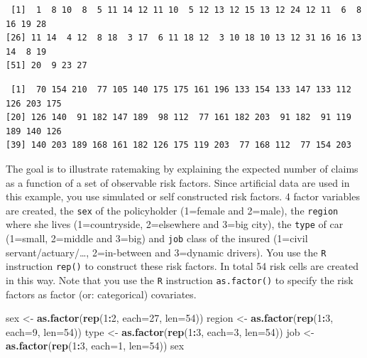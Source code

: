 \documentclass[
]{book}
\newenvironment{Shaded}{\begin{snugshade}}{\end{snugshade}}
\newcommand{\DataTypeTok}[1]{\textcolor[rgb]{0.13,0.29,0.53}{#1}}
\newcommand{\DecValTok}[1]{\textcolor[rgb]{0.00,0.00,0.81}{#1}}
\newcommand{\KeywordTok}[1]{\textcolor[rgb]{0.13,0.29,0.53}{\textbf{#1}}}
\newcommand{\NormalTok}[1]{#1}
\newcommand{\OperatorTok}[1]{\textcolor[rgb]{0.81,0.36,0.00}{\textbf{#1}}}
\newcommand{\StringTok}[1]{\textcolor[rgb]{0.31,0.60,0.02}{#1}}
\begin{document}
\begin{verbatim}
 [1]  1  8 10  8  5 11 14 12 11 10  5 12 13 12 15 13 12 24 12 11  6  8 16 19 28
[26] 11 14  4 12  8 18  3 17  6 11 18 12  3 10 18 10 13 12 31 16 16 13 14  8 19
[51] 20  9 23 27
\end{verbatim}

\begin{verbatim}
 [1]  70 154 210  77 105 140 175 175 161 196 133 154 133 147 133 112 126 203 175
[20] 126 140  91 182 147 189  98 112  77 161 182 203  91 182  91 119 189 140 126
[39] 140 203 189 168 161 182 126 175 119 203  77 168 112  77 154 203
\end{verbatim}

The goal is to illustrate ratemaking by explaining the expected number of claims as a function of a set of observable risk factors. Since artificial data are used in this example, you use simulated or self constructed risk factors. 4 factor variables are created, the \texttt{sex} of the policyholder (1=female and 2=male), the \texttt{region} where she lives (1=countryside, 2=elsewhere and 3=big city), the \texttt{type} of car (1=small, 2=middle and 3=big) and \texttt{job} class of the insured (1=civil servant/actuary/\ldots, 2=in-between and 3=dynamic drivers). You use the \texttt{R} instruction \texttt{rep()} to construct these risk factors. In total 54 risk cells are created in this way. Note that you use the \texttt{R} instruction \texttt{as.factor()} to specify the risk factors as factor (or: categorical) covariates.

\begin{Shaded}
\begin{Highlighting}[]
\NormalTok{sex <-}\StringTok{ }\KeywordTok{as.factor}\NormalTok{(}\KeywordTok{rep}\NormalTok{(}\DecValTok{1}\OperatorTok{:}\DecValTok{2}\NormalTok{, }\DataTypeTok{each=}\DecValTok{27}\NormalTok{, }\DataTypeTok{len=}\DecValTok{54}\NormalTok{))}
\NormalTok{region <-}\StringTok{ }\KeywordTok{as.factor}\NormalTok{(}\KeywordTok{rep}\NormalTok{(}\DecValTok{1}\OperatorTok{:}\DecValTok{3}\NormalTok{, }\DataTypeTok{each=}\DecValTok{9}\NormalTok{, }\DataTypeTok{len=}\DecValTok{54}\NormalTok{))}
\NormalTok{type <-}\StringTok{ }\KeywordTok{as.factor}\NormalTok{(}\KeywordTok{rep}\NormalTok{(}\DecValTok{1}\OperatorTok{:}\DecValTok{3}\NormalTok{, }\DataTypeTok{each=}\DecValTok{3}\NormalTok{, }\DataTypeTok{len=}\DecValTok{54}\NormalTok{))}
\NormalTok{job <-}\StringTok{ }\KeywordTok{as.factor}\NormalTok{(}\KeywordTok{rep}\NormalTok{(}\DecValTok{1}\OperatorTok{:}\DecValTok{3}\NormalTok{, }\DataTypeTok{each=}\DecValTok{1}\NormalTok{, }\DataTypeTok{len=}\DecValTok{54}\NormalTok{))}
\NormalTok{sex}
\end{Highlighting}
\end{Shaded}
\end{document}
